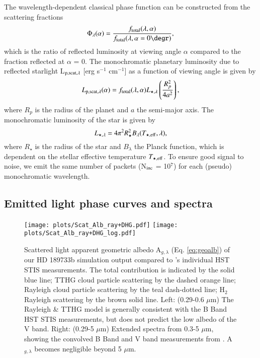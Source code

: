 \documentclass{aa}
\begin{document}
The wavelength-dependent classical phase function \citep[e.g.][]{Seager2010,Madhusudhan2012} can be constructed from the scattering fractions
\begin{equation}
\label{eq:phasefunction}
\Phi_{\lambda}(\alpha) = \frac{f_{\rm total}(\lambda, \alpha)}{f_{\rm total}(\lambda, \alpha = 0\degr)},
\end{equation}
which is the ratio of reflected luminosity at viewing angle $\alpha$ compared to the fraction reflected at $\alpha$ = 0\degr.
The monochromatic planetary luminosity due to reflected starlight L$_{\rm p, scat, \lambda}$ [erg s$^{-1}$ cm$^{-1}$] as a function of viewing angle is given by
\begin{equation}
L_{\rm p, scat, \lambda}(\alpha)  = f_{\rm total}(\lambda, \alpha) L_{\star, \lambda} \left(\frac{R_{p}^{2}}{4a^{2}}\right)  , 
\end{equation}
where $R_{p}$ is the radius of the planet and $a$ the semi-major axis.
The monochromatic luminosity of the star is given by
\begin{equation}
\label{eq:star_lum}
L_{\star, \lambda} = 4 \pi^{2}R_{\star}^{2}B_{\lambda} (T_{\rm \star, eff}, \lambda), 
\end{equation}
where $R_{\star}$ is the radius of the star and $B_{\lambda}$ the Planck function, which is dependent on the stellar effective temperature $T_{\rm \star, eff}$.
To ensure good signal to noise, we emit the same number of packets (N$_{\rm inc}$ = 10$^{7}$) for each (pseudo) monochromatic wavelength.

\subsection{Emitted light phase curves and spectra}

\begin{figure*}
   \centering
   \texttt{[image: plots/Scat\_Alb\_ray+DHG.pdf]}   
   \texttt{[image: plots/Scat\_Alb\_ray+DHG\_log.pdf]}
   \caption{Scattered light apparent geometric albedo A$_{g, \lambda}$ (Eq. \ref{eq:geoalb}) of our HD 189733b simulation output compared to \citet{Evans2013}'s individual HST STIS measurements.
   The total contribution is indicated by the solid blue line; TTHG cloud particle scattering by the dashed orange line; Rayleigh cloud particle scattering by the teal dash-dotted line; H$_{2}$ Rayleigh scattering by the brown solid line.
   Left: (0.29-0.6 $\mu$m) The Rayleigh \& TTHG model is generally consistent with the B Band HST STIS measurements, but does not predict the low albedo of the V band.
   Right: (0.29-5 $\mu$m) Extended spectra from 0.3-5 $\mu$m, showing the convolved B Band and V band measurements from \citet{Evans2013}. 
   A$_{g, \lambda}$ becomes negligible beyond 5 $\mu$m.}
   \label{fig:geoalb}
\end{figure*}
\end{document}
